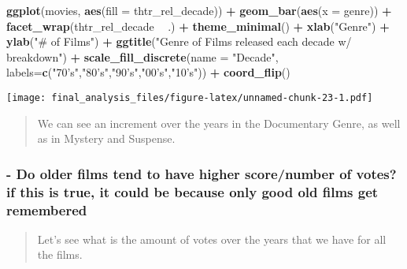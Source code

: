\documentclass[]{article}
\newenvironment{Shaded}{\begin{snugshade}}{\end{snugshade}}
\newcommand{\DataTypeTok}[1]{\textcolor[rgb]{0.13,0.29,0.53}{#1}}
\newcommand{\KeywordTok}[1]{\textcolor[rgb]{0.13,0.29,0.53}{\textbf{#1}}}
\newcommand{\NormalTok}[1]{#1}
\newcommand{\OperatorTok}[1]{\textcolor[rgb]{0.81,0.36,0.00}{\textbf{#1}}}
\newcommand{\StringTok}[1]{\textcolor[rgb]{0.31,0.60,0.02}{#1}}
\begin{document}
\begin{Shaded}
\begin{Highlighting}[]
\KeywordTok{ggplot}\NormalTok{(movies, }\KeywordTok{aes}\NormalTok{(}\DataTypeTok{fill =}\NormalTok{ thtr_rel_decade)) }\OperatorTok{+}\StringTok{ }\KeywordTok{geom_bar}\NormalTok{(}\KeywordTok{aes}\NormalTok{(}\DataTypeTok{x =}\NormalTok{ genre)) }\OperatorTok{+}\StringTok{ }\KeywordTok{facet_wrap}\NormalTok{(thtr_rel_decade }\OperatorTok{~}\StringTok{ }\NormalTok{.) }\OperatorTok{+}\StringTok{ }\KeywordTok{theme_minimal}\NormalTok{() }\OperatorTok{+}\StringTok{ }\KeywordTok{xlab}\NormalTok{(}\StringTok{"Genre"}\NormalTok{) }\OperatorTok{+}\StringTok{ }\KeywordTok{ylab}\NormalTok{(}\StringTok{"# of Films"}\NormalTok{) }\OperatorTok{+}\StringTok{ }\KeywordTok{ggtitle}\NormalTok{(}\StringTok{"Genre of Films released each decade w/ breakdown"}\NormalTok{) }\OperatorTok{+}\StringTok{ }\KeywordTok{scale_fill_discrete}\NormalTok{(}\DataTypeTok{name =} \StringTok{"Decade"}\NormalTok{, }\DataTypeTok{labels=}\KeywordTok{c}\NormalTok{(}\StringTok{"70's"}\NormalTok{,}\StringTok{"80's"}\NormalTok{,}\StringTok{"90's"}\NormalTok{,}\StringTok{"00's"}\NormalTok{,}\StringTok{"10's"}\NormalTok{)) }\OperatorTok{+}\StringTok{ }\KeywordTok{coord_flip}\NormalTok{()}
\end{Highlighting}
\end{Shaded}

\texttt{[image: final\_analysis\_files/figure-latex/unnamed-chunk-23-1.pdf]}

\begin{quote}
We can see an increment over the years in the Documentary Genre, as well
as in Mystery and Suspense.
\end{quote}

\hypertarget{do-older-films-tend-to-have-higher-scorenumber-of-votes-if-this-is-true-it-could-be-because-only-good-old-films-get-remembered-1}{%
\subsubsection{- Do older films tend to have higher score/number of
votes? if this is true, it could be because only good old films get
remembered}\label{do-older-films-tend-to-have-higher-scorenumber-of-votes-if-this-is-true-it-could-be-because-only-good-old-films-get-remembered-1}}

\begin{quote}
Let's see what is the amount of votes over the years that we have for
all the films.
\end{quote}
\end{document}

